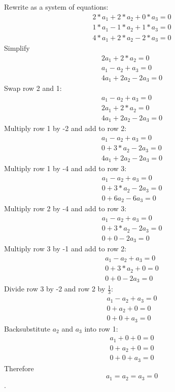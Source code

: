 \begin{Answer}[ref=vector_independence]
    Rewrite as a system of equations:
        $$\begin{matrix}
			2*a_1 +2*a_2 + 0*a_3 = 0 \\
			1*a_1 - 1*a_2 + 1*a_3 = 0 \\
			4*a_1 + 2*a_2 - 2*a_3 = 0
		  \end{matrix} $$
	Simplify
		$$\begin{matrix}
			2a_1 +2*a_2 = 0 \\
			a_1 - a_2 + a_3 = 0 \\
			4a_1 + 2a_2 - 2a_3 = 0
		  \end{matrix} $$
	Swap row 2 and 1:
		$$\begin{matrix}
			a_1 - a_2 + a_3 = 0 \\
			2a_1 + 2*a_2 = 0 \\
			4a_1 + 2a_2 - 2a_3 = 0
		  \end{matrix} $$
	Multiply row 1 by -2 and add to row 2:
	   $$\begin{matrix}
			a_1 - a_2 + a_3 = 0 \\
			0 +  3*a_2 - 2a_3  = 0 \\
			4a_1 + 2a_2 - 2a_3 = 0
		  \end{matrix} $$
	Multiply row 1 by -4 and add to row 3:	
	    $$\begin{matrix}
			a_1 - a_2 + a_3 = 0 \\
			0 + 3*a_2 -2a_3 = 0 \\
			0 + 6a_2 - 6a_3 = 0
		  \end{matrix} $$
	Multiply row 2 by -4 and add to row 3:
	   $$\begin{matrix}
			a_1 - a_2 + a_3 = 0 \\
			0 + 3*a_2 -2a_3 = 0 \\
			0 + 0 - 2a_3 = 0
		  \end{matrix} $$
	Multiply row 3 by -1 and add to row 2:
		$$\begin{matrix}
			a_1 - a_2 + a_3 = 0 \\
			0 + 3*a_2 + 0 = 0 \\
			0 + 0 - 2a_3 = 0
		\end{matrix} $$
    Divide row 3 by -2 and row 2 by $\frac{1}{3}$:
    	$$\begin{matrix}
			a_1 - a_2 + a_3 = 0 \\
			0 +  a_2 +0  = 0 \\
			0  + 0  + a_3 = 0
		\end{matrix} $$
	Backsubstitute $a_2$ and $a_3$ into row 1:
	 	$$\begin{matrix}
			a_1 + 0 + 0 = 0 \\
			0 +  a_2 + 0   = 0 \\
			0   + 0  + a_3 = 0
		\end{matrix} $$
	 Therefore $$a_1 = a_2 = a_3 = 0$$.
\end{Answer}
    
